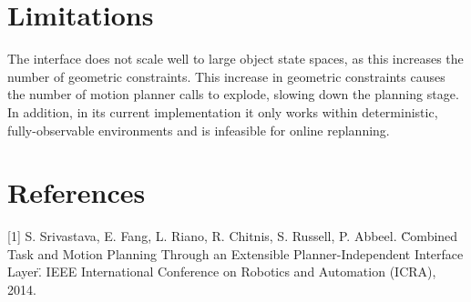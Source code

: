 \documentclass[12pt]{article}
\begin{document}
\section{Limitations}

The interface does not scale well to large object state spaces, as this increases the number of geometric constraints. 
This increase in geometric constraints causes the number of motion planner calls to explode, slowing down the planning stage. 
In addition, in its current implementation it only works within deterministic, fully-observable environments and is infeasible for online replanning.

\section{References}

[1] S. Srivastava, E. Fang, L. Riano, R. Chitnis, S. Russell, P. Abbeel. \"Combined Task and Motion Planning Through an Extensible Planner-Independent Interface Layer\". IEEE International Conference on Robotics and Automation (ICRA), 2014.
\end{document}
